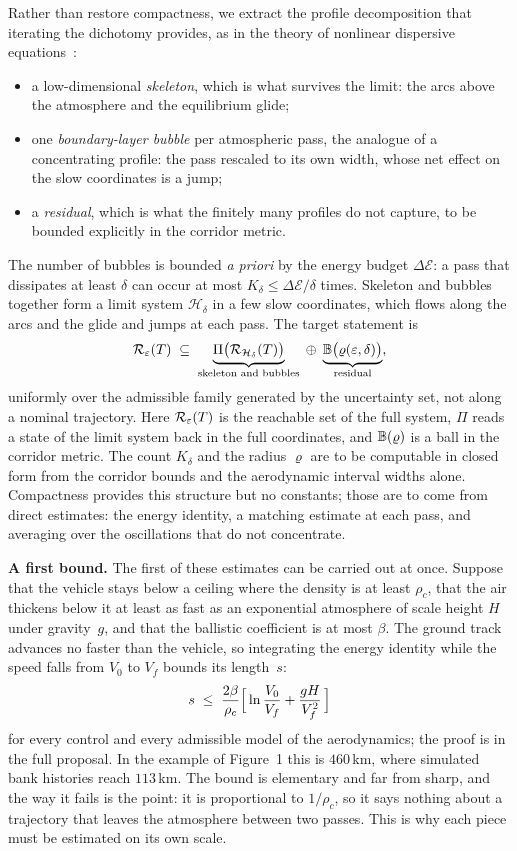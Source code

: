 \documentclass[english,10pt]{extarticle}
\newcommand{\head}[1]{\par\smallskip\noindent\textbf{#1}\enspace}
\begin{document}
Rather than restore compactness, we extract the profile decomposition that
iterating the dichotomy provides, as in the theory of nonlinear dispersive
equations~\cite{bahouri1999high}:
\begin{itemize}[leftmargin=1.6em,itemsep=0pt,topsep=2pt]
  \item a low-dimensional \emph{skeleton}, which is what survives the limit:
    the arcs above the atmosphere and the equilibrium glide;
  \item one \emph{boundary-layer bubble} per atmospheric pass, the analogue
    of a concentrating profile: the pass rescaled to its own width, whose
    net effect on the slow coordinates is a jump;
  \item a \emph{residual}, which is what the finitely many profiles do not
    capture, to be bounded explicitly in the corridor metric.
\end{itemize}
The number of bubbles is bounded \emph{a priori} by the energy budget
$\Delta\mathcal{E}$: a pass that dissipates at least $\delta$ can occur at
most $K_\delta\le\Delta\mathcal{E}/\delta$ times. Skeleton and bubbles together
form a limit system $\mathcal{H}_\delta$ in a few slow coordinates, which
flows along the arcs and the glide and jumps at each pass. The target
statement is
\[
  \mathcal{R}_\varepsilon(T) \;\subseteq\;
  \underbrace{\Pi\bigl(\mathcal{R}_{\mathcal{H}_\delta}(T)\bigr)}_{\text{skeleton and bubbles}}
  \;\oplus\;
  \underbrace{\mathbb{B}\bigl(\varrho(\varepsilon,\delta)\bigr)}_{\text{residual}},
\]
uniformly over the admissible family generated by the uncertainty set, not
along a nominal trajectory. Here $\mathcal{R}_\varepsilon(T)$ is the reachable set of
the full system, $\Pi$ reads a state of the limit system back in the full
coordinates, and $\mathbb{B}(\varrho)$ is a ball in the corridor metric. The
count $K_\delta$ and the radius $\varrho$
are to be computable in closed form from the corridor bounds and the
aerodynamic interval widths alone. Compactness provides this structure but
no constants; those are to come from direct estimates: the energy identity, a
matching estimate at each pass, and averaging over the oscillations that do
not concentrate.

\head{A first bound.}
The first of these estimates can be carried out at once. Suppose that the
vehicle stays below a ceiling where the density is at least $\rho_c$, that
the air thickens below it at least as fast as an exponential atmosphere of
scale height $H$ under gravity~$g$, and that the ballistic coefficient is
at most $\beta$. The ground track advances no faster than the vehicle, so
integrating the energy identity while the speed falls from $V_0$ to $V_f$
bounds its length~$s$:
\[
  s \;\le\; \frac{2\beta}{\rho_c}
  \Bigl[\,\ln\frac{V_0}{V_f} + \frac{g H}{V_f^{2}}\,\Bigr]
\]
for every control and every admissible model of the aerodynamics; the proof
is in the full proposal. In the example of Figure~1 this is $460$\,km,
where simulated bank histories reach $113$\,km. The bound is elementary and far from sharp, and the way it
fails is the point: it is proportional to $1/\rho_c$, so it says nothing
about a trajectory that leaves the atmosphere between two passes. This is
why each piece must be estimated on its own scale.
\end{document}
